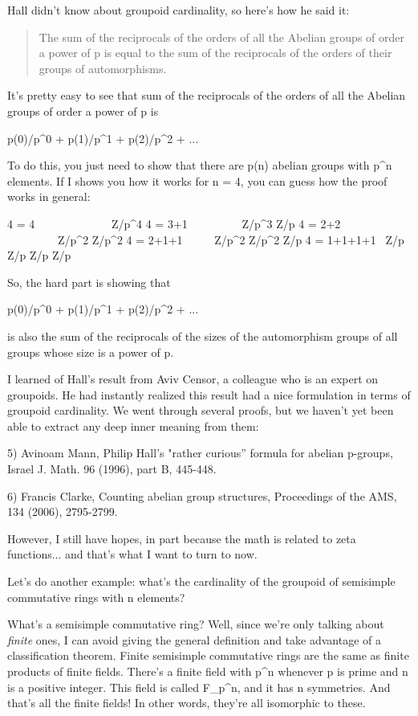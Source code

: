 Hall didn't know about groupoid cardinality, so here's how he said it:

\begin{quote}

The sum of the reciprocals of the orders of all the Abelian groups of
order a power of p is equal to the sum of the reciprocals of the
orders of their groups of automorphisms.

\end{quote}

It's pretty easy to see that sum of the reciprocals of the orders
of all the Abelian groups of order a power of p is

p(0)/p^{0} + p(1)/p^{1} + p(2)/p^{2} + ...

To do this, you just need to show that there are p(n) abelian groups
with p^{n} elements.  If I shows you how it works for n = 4,
you can guess how the proof works in general:

4 = 4   \ \ \ \ \ \ \ \ \ \ \ \ \ 
     Z/p^{4}   
4 = 3+1  \ \ \ \ \ \ \ \ \           Z/p^{3} \times  Z/p
4 = 2+2   \ \ \ \ \ \ \ \ \         Z/p^{2} \times  Z/p^{2} 
4 = 2+1+1  \ \ \ \ \      Z/p^{2} \times  Z/p^{2} \times  Z/p
4 = 1+1+1+1  \       Z/p \times  Z/p \times  Z/p \times  Z/p

So, the hard part is showing that 

p(0)/p^{0} + p(1)/p^{1} + p(2)/p^{2} + ...

is also the sum of the reciprocals of the sizes of the
automorphism groups of all groups whose size is a power of p.

I learned of Hall's result from Aviv Censor, a colleague who is an
expert on groupoids.  He had instantly realized this result had a nice
formulation in terms of groupoid cardinality.  We went through
several proofs, but we haven't yet been able to extract any deep inner
meaning from them:

5) Avinoam Mann, Philip Hall's "rather curious'' formula for
abelian p-groups, Israel J. Math. 96 (1996), part B, 445-448.

6) Francis Clarke, Counting abelian group structures, Proceedings of
the AMS, 134 (2006), 2795-2799.

However, I still have hopes, in part because the math is related to
zeta functions... and that's what I want to turn to now.

Let's do another example: what's the cardinality of the groupoid of
semisimple commutative rings with n elements?

What's a semisimple commutative ring?  Well, since we're only talking
about \emph{finite} ones, I can avoid giving the general definition
and take advantage of a classification theorem.  Finite semisimple
commutative rings are the same as finite products of finite fields.
There's a finite field with p^{n} whenever p is prime and n is
a positive integer.  This field is called F_{p^{n}},
and it has n symmetries.  And that's all the finite fields!  In other
words, they're all isomorphic to these.

